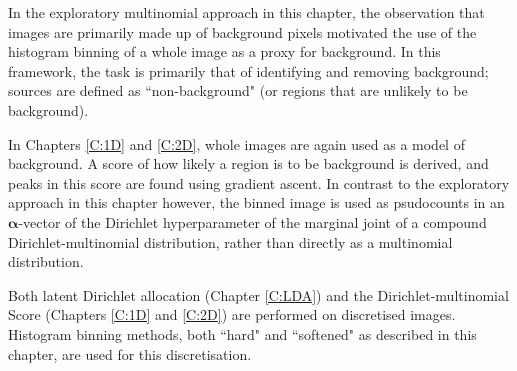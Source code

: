 In the exploratory multinomial approach in this chapter, the observation that images are primarily made up of background pixels motivated the use of the histogram binning of a whole image as a proxy for background. In this framework, the task is primarily that of identifying and removing background; sources are defined as ``non-background" (or regions that are unlikely to be background). 

In Chapters \ref{C:1D} and \ref{C:2D}, whole images are again used as a model of background. A score of how likely a region is to be background is derived, and peaks in this score are found using gradient ascent. In contrast to the exploratory approach in this chapter however, the binned image is used as psudocounts in an $\boldsymbol{\alpha}$-vector of the Dirichlet hyperparameter of the marginal joint of a compound Dirichlet-multinomial distribution, rather than directly as a multinomial distribution. 

Both latent Dirichlet allocation (Chapter \ref{C:LDA}) and the Dirichlet-multinomial Score (Chapters \ref{C:1D} and \ref{C:2D}) are performed on discretised images. Histogram binning methods, both ``hard" and ``softened" as described in this chapter, are used for this discretisation.
